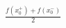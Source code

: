 \documentclass[preview]{standalone}
\begin{document}
\begin{center}
$\displaystyle{\frac{f(x_0^+)+f(x_0^-)}{2}}$
\end{center}
\end{document}

